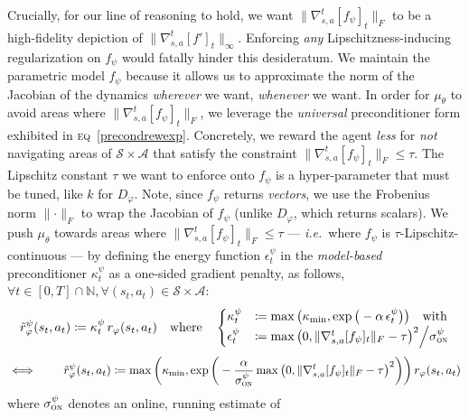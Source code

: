 Crucially, for our line of reasoning to hold, we want $\lVert\nabla_{s,a}^t[f_\psi]_t\rVert _F$ to be
a high-fidelity depiction of $\lVert\nabla_{s,a}^t[f']_t\rVert _\infty$.
Enforcing \emph{any} Lipschitzness-inducing regularization on $f_\psi$ would fatally hinder
this desideratum.
We maintain the parametric model $f_\psi$
because it allows us to approximate the norm of the Jacobian of the dynamics
\emph{wherever} we want, \emph{whenever} we want.
In order for $\mu_\theta$ to avoid areas where $\lVert\nabla_{s,a}^t[f_\psi]_t\rVert _F$,
we leverage the \emph{universal} preconditioner form exhibited in \textsc{eq}~\ref{precondrewexp}.
Concretely, we reward the agent \emph{less} for
\emph{not} navigating areas of $\mathcal{S} \times \mathcal{A}$ that satisfy the constraint
$\lVert\nabla_{s,a}^t[f_\psi]_t\rVert _F \leq \tau$.
The Lipschitz constant $\tau$ we want to enforce onto $f_\psi$ is a hyper-parameter that must be tuned,
like $k$ for $D_\varphi$.
Note, since $f_\psi$ returns \emph{vectors},
we use the Frobenius norm
$\lVert\cdot\rVert _F$
to wrap the Jacobian of $f_\psi$
(unlike $D_\varphi$, which returns scalars).
We push $\mu_\theta$ towards areas where $\lVert\nabla_{s,a}^t[f_\psi]_t\rVert _F \leq \tau$
--- \textit{i.e.}~where $f_\psi$ is $\tau$-Lipschitz-continuous ---
by defining the energy function $\epsilon_t^\psi$ in the
\emph{model-based} preconditioner $\kappa_t^\psi$ as a one-sided gradient penalty, as follows,
$\forall t \in [0, T] \cap \mathbb{N},
\forall (s_t, a_t) \in \mathcal{S} \times \mathcal{A}$:
\begin{align}
\tilde{r}_\varphi^\psi (s_t,a_t)
\coloneqq \kappa_t^\psi \, r_\varphi (s_t,a_t)
\quad \text{where} \quad
\begin{cases}
\kappa_t^\psi &\coloneqq \max\big(\kappa_\text{min}, \exp \big(-\alpha \, \epsilon_t^\psi\big)\big)
\quad \text{with} \\
\epsilon_t^\psi &\coloneqq
\max \big(0, \lVert\nabla_{s,a}^t[f_\psi]_t\rVert _F - \tau\big)^2 \Big/ \sigma_\textsc{on}^\psi
\end{cases}
\label{precondrewf1}
\end{align}
\begin{align}
\iff \qquad
\tilde{r}_\varphi^\psi(s_t,a_t)
\coloneqq \max\bigg(\kappa_\text{min}, \exp \bigg(- \frac{\alpha}{\sigma_\textsc{on}^\psi}
\max \big(0, \lVert\nabla_{s,a}^t[f_\psi]_t\rVert _F - \tau\big)^2\bigg)\bigg)
\, r_\varphi (s_t,a_t)
\label{precondrewf2}
\end{align}
where
$\sigma_\textsc{on}^\psi$ denotes an online, running estimate of
